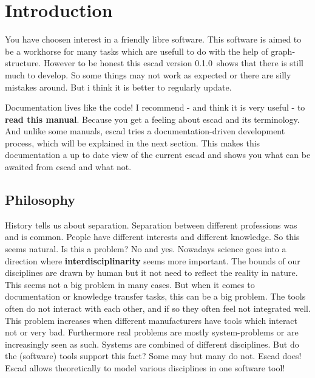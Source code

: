 \documentclass[a4paper, 12pt, openany]{scrbook}
\newcommand{\EscadVersion}{0.1.0}
\begin{document}
\tableofcontents

\chapter{Introduction}
You have choosen interest in a friendly libre software. This software is aimed to be a workhorse for many tasks which are usefull to do with the help of graph-structure. However to be honest this escad version \EscadVersion\ shows that there is still much to develop. So some things may not work as expected or there are silly mistakes around. But i think it is better to regularly update.

Documentation lives like the code! I recommend - and think it is very useful - to \textbf{read this manual}. Because you get a feeling about escad and its terminology. And unlike some manuals, escad tries a documentation-driven development process, which will be explained in the next section. This makes this documentation a up to date view of the current escad and shows you what can be awaited from escad and what not.
\section{Philosophy}
History tells us about separation. Separation between different professions was and is common. People have different interests and different knowledge. So this seems natural. Is this a problem? No and yes. Nowadays science goes into a direction where \textbf{interdisciplinarity} seems more important. The bounds of our disciplines are drawn by human but it not need to reflect the reality in nature. This seems not a big problem in many cases. But when it comes to documentation or knowledge transfer tasks, this can be a big problem. The tools often do not interact with each other, and if so they often feel not integrated well. This problem increases when different manufacturers have tools which interact not or very bad. Furthermore real problems are mostly system-problems or are increasingly seen as such. Systems are combined of different disciplines. But do the (software) tools support this fact? Some may but many do not. Escad does! Escad allows theoretically to model various disciplines in one software tool!
\end{document}
